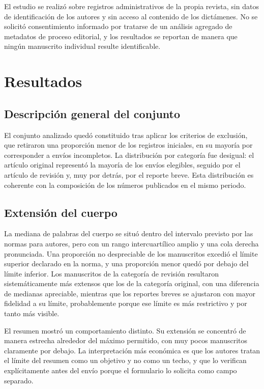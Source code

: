 \documentclass{apm-editorial}
\begin{document}
El estudio se realizó sobre registros administrativos de la propia
revista, sin datos de identificación de los autores y sin acceso al
contenido de los dictámenes. No se solicitó consentimiento informado
por tratarse de un análisis agregado de metadatos de proceso editorial,
y los resultados se reportan de manera que ningún manuscrito individual
resulte identificable.

\section*{Resultados}

\subsection*{Descripción general del conjunto}

El conjunto analizado quedó constituido tras aplicar los criterios de
exclusión, que retiraron una proporción menor de los registros
iniciales, en su mayoría por corresponder a envíos incompletos. La
distribución por categoría fue desigual: el artículo original
representó la mayoría de los envíos elegibles, seguido por el artículo
de revisión y, muy por detrás, por el reporte breve. Esta distribución
es coherente con la composición de los números publicados en el mismo
periodo.

\subsection*{Extensión del cuerpo}

La mediana de palabras del cuerpo se situó dentro del intervalo
previsto por las normas para autores, pero con un rango intercuartílico
amplio y una cola derecha pronunciada. Una proporción no despreciable
de los manuscritos excedió el límite superior declarado en la norma, y
una proporción menor quedó por debajo del límite inferior. Los
manuscritos de la categoría de revisión resultaron sistemáticamente más
extensos que los de la categoría original, con una diferencia de
medianas apreciable, mientras que los reportes breves se ajustaron con
mayor fidelidad a su límite, probablemente porque ese límite es más
restrictivo y por tanto más visible.

El resumen mostró un comportamiento distinto. Su extensión se concentró
de manera estrecha alrededor del máximo permitido, con muy pocos
manuscritos claramente por debajo. La interpretación más económica es
que los autores tratan el límite del resumen como un objetivo y no como
un techo, y que lo verifican explícitamente antes del envío porque el
formulario lo solicita como campo separado.
\end{document}
